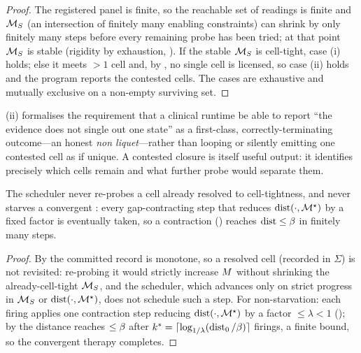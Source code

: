 \begin{proof}
The registered panel is finite, so the reachable set of readings is finite and
$\mathcal{M}_S$ (an intersection of finitely many enabling constraints) can shrink by
only finitely many steps before every remaining probe has been tried; at that
point $\mathcal{M}_S$ is stable (rigidity by exhaustion, ). If the
stable $\mathcal{M}_S$ is cell-tight, case (i) holds; else it meets $>1$ cell and, by
, no single cell is licensed, so case (ii) holds and the program
reports the contested cells. The cases are exhaustive and mutually exclusive on
a non-empty surviving set.
\end{proof}

\begin{remark}
\label{cfc:rem:decline-not-failure}
(ii) formalises the requirement that a clinical runtime be
able to report ``the evidence does not single out one state'' as a first-class,
correctly-terminating outcome---an honest \emph{non liquet}---rather than
looping or silently emitting one contested cell as if unique. A contested
closure is itself useful output: it identifies precisely which cells remain and
what further probe would separate them.
\end{remark}

\begin{theorem}
\label{cfc:thm:scheduler}
The  scheduler never re-probes a cell already resolved to
cell-tightness, and never starves a convergent : every
gap-contracting step that reduces $\operatorname{dist}(\cdot,\mathcal{M}^{\star})$ by a fixed factor is
eventually taken, so a contraction () reaches
$\operatorname{dist}\le\beta$ in finitely many steps.
\end{theorem}

\begin{proof}
By  the committed record is monotone, so a resolved cell
(recorded in $\Sigma$) is not revisited: re-probing it would strictly increase
$M$ without shrinking the already-cell-tight $\mathcal{M}_S$, and the scheduler,
which advances only on strict progress in $\mathcal{M}_S$ or $\operatorname{dist}(\cdot,\mathcal{M}^{\star})$, does
not schedule such a step. For non-starvation: each  firing applies one
contraction step reducing $\operatorname{dist}(\cdot,\mathcal{M}^{\star})$ by a factor $\le\lambda<1$
(); by  the distance reaches
$\le\beta$ after $k^{\ast}=\lceil\log_{1/\lambda}(\operatorname{dist}_0/\beta)\rceil$ firings,
a finite bound, so the convergent therapy completes.
\end{proof}

